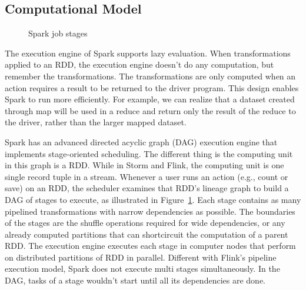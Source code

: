 \subsection{Computational Model}

\begin{figure}
  \begin{center}
   \caption{Spark job stages\cite{zaharia2012resilient}}
   \label{fig:spark_stage}
  \end{center}
\end{figure}

The execution engine of Spark supports lazy evaluation. When transformations applied to an RDD, the execution engine doesn't do any computation, but remember the transformations. The transformations are only computed when an action requires a result to be returned to the driver program. This design enables Spark to run more efficiently. For example, we can realize that a dataset created through map will be used in a reduce and return only the result of the reduce to the driver, rather than the larger mapped dataset.

Spark has an advanced directed acyclic graph (DAG) execution engine that implements stage-oriented scheduling. The different thing is the computing unit in this graph is a RDD. While in Storm and Flink, the computing unit is one single record tuple in a stream. Whenever a user runs an action (e.g., count or save) on an RDD, the scheduler examines that RDD's lineage graph to build a DAG of stages to execute, as illustrated in Figure~\ref{fig:spark_stage}. Each stage contains as many pipelined transformations with narrow dependencies as possible. The boundaries of the stages are the shuffle operations required for wide dependencies, or any already computed partitions that can shortcircuit the computation of a parent RDD\cite{zaharia2012resilient}. The execution engine executes each stage in computer nodes that perform on distributed partitions of RDD in parallel. Different with Flink's pipeline execution model, Spark does not execute multi stages simultaneously\cite{shi2015clash}. In the DAG, tasks of a stage wouldn't start until all its dependencies are done. 


